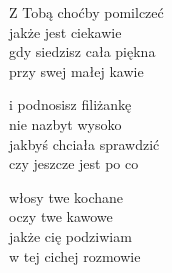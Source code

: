\begin{text}
    Z Tobą choćby pomilczeć\\
    jakże jest ciekawie\\
    gdy siedzisz cała piękna\\
    przy swej małej kawie

    i podnosisz filiżankę\\
    nie nazbyt wysoko\\
    jakbyś chciała sprawdzić\\
    czy jeszcze jest po co

    włosy twe kochane\\
    oczy twe kawowe\\
    jakże cię podziwiam\\
    w tej cichej rozmowie
\end{text}
\begin{chord}

\end{chord}